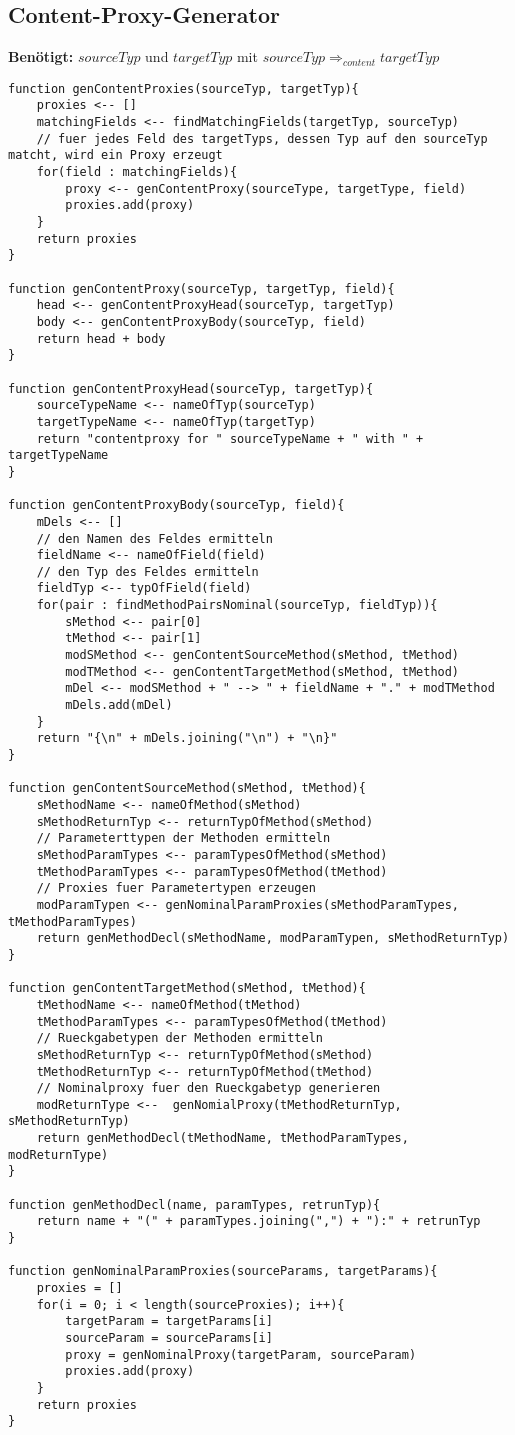 \documentclass[a4paper,12pt]{article}
\begin{document}
\subsection{Content-Proxy-Generator}
\textbf{Benötigt: }$sourceTyp$ und $targetTyp$ mit $sourceTyp \Rightarrow_{content} targetTyp$
\begin{lstlisting}[style = generator]
function genContentProxies(sourceTyp, targetTyp){
	proxies <-- []
	matchingFields <-- findMatchingFields(targetTyp, sourceTyp)
	// fuer jedes Feld des targetTyps, dessen Typ auf den sourceTyp matcht, wird ein Proxy erzeugt
	for(field : matchingFields){
		proxy <-- genContentProxy(sourceType, targetType, field)
		proxies.add(proxy)
	}
	return proxies
}

function genContentProxy(sourceTyp, targetTyp, field){
	head <-- genContentProxyHead(sourceTyp, targetTyp)
	body <-- genContentProxyBody(sourceTyp, field)
	return head + body
}

function genContentProxyHead(sourceTyp, targetTyp){
	sourceTypeName <-- nameOfTyp(sourceTyp)
	targetTypeName <-- nameOfTyp(targetTyp)
	return "contentproxy for " sourceTypeName + " with " + targetTypeName
}

function genContentProxyBody(sourceTyp, field){
	mDels <-- []
	// den Namen des Feldes ermitteln	
	fieldName <-- nameOfField(field)
	// den Typ des Feldes ermitteln
	fieldTyp <-- typOfField(field)
	for(pair : findMethodPairsNominal(sourceTyp, fieldTyp)){
		sMethod <-- pair[0]
		tMethod <-- pair[1]
		modSMethod <-- genContentSourceMethod(sMethod, tMethod)
		modTMethod <-- genContentTargetMethod(sMethod, tMethod)		
		mDel <-- modSMethod + " --> " + fieldName + "." + modTMethod
		mDels.add(mDel)
	}
	return "{\n" + mDels.joining("\n") + "\n}"
}

function genContentSourceMethod(sMethod, tMethod){
	sMethodName <-- nameOfMethod(sMethod)
	sMethodReturnTyp <-- returnTypOfMethod(sMethod)
	// Parameterttypen der Methoden ermitteln
	sMethodParamTypes <-- paramTypesOfMethod(sMethod)
	tMethodParamTypes <-- paramTypesOfMethod(tMethod)	
	// Proxies fuer Parametertypen erzeugen
	modParamTypen <-- genNominalParamProxies(sMethodParamTypes, tMethodParamTypes)
	return genMethodDecl(sMethodName, modParamTypen, sMethodReturnTyp)
}

function genContentTargetMethod(sMethod, tMethod){
	tMethodName <-- nameOfMethod(tMethod)
	tMethodParamTypes <-- paramTypesOfMethod(tMethod)
	// Rueckgabetypen der Methoden ermitteln
	sMethodReturnTyp <-- returnTypOfMethod(sMethod)
	tMethodReturnTyp <-- returnTypOfMethod(tMethod)
	// Nominalproxy fuer den Rueckgabetyp generieren	
	modReturnType <--  genNomialProxy(tMethodReturnTyp, sMethodReturnTyp)
	return genMethodDecl(tMethodName, tMethodParamTypes, modReturnType)
}

function genMethodDecl(name, paramTypes, retrunTyp){
	return name + "(" + paramTypes.joining(",") + "):" + retrunTyp
}

function genNominalParamProxies(sourceParams, targetParams){
	proxies = []	
	for(i = 0; i < length(sourceProxies); i++){
		targetParam = targetParams[i]
		sourceParam = sourceParams[i]
		proxy = genNominalProxy(targetParam, sourceParam)
		proxies.add(proxy)
	}
	return proxies
}
\end{lstlisting}
\end{document}

